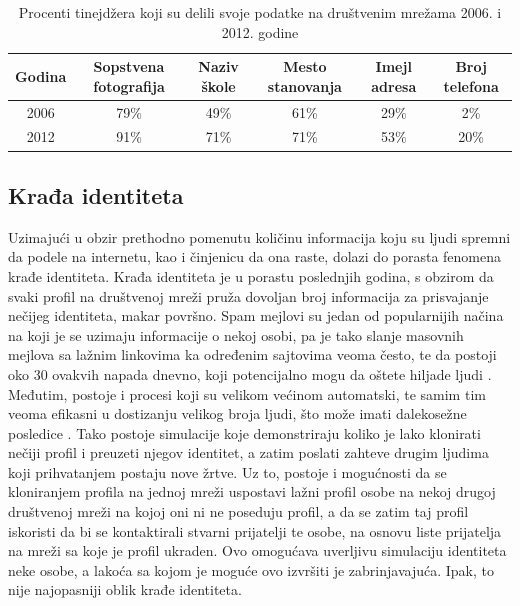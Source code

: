 \documentclass[a4paper]{article}
\begin{document}
\begin{table}[h!]
	\begin{center}
		\caption{Procenti tinejdžera koji su delili svoje podatke na društvenim mrežama 2006. i 2012. godine}
		\begin{tabular}{|c | c c c c c|} \hline
			Godina & Sopstvena fotografija & Naziv škole & Mesto stanovanja & Imejl adresa & Broj telefona \\
			\hline
			2006 & 79\% & 49\% & 61\% & 29\% & 2\% \\
			2012 & 91\% & 71\% & 71\% & 53\% & 20\%\\
			\hline
		\end{tabular}
		\label{tab:tabela1}
	\end{center}
\end{table}

\subsection{Krađa identiteta}
Uzimajući u obzir prethodno pomenutu količinu informacija koju su ljudi spremni da podele na internetu, kao i činjenicu da ona raste, dolazi do porasta fenomena krađe identiteta. Krađa identiteta je u porastu poslednjih godina, s obzirom da svaki profil na društvenoj mreži pruža dovoljan broj informacija za prisvajanje nečijeg identiteta, makar površno. Spam mejlovi su jedan od popularnijih načina na koji je se uzimaju informacije o nekoj osobi, pa je tako slanje masovnih mejlova sa lažnim linkovima ka određenim sajtovima veoma često, te da postoji oko 30 ovakvih napada dnevno, koji potencijalno mogu da oštete hiljade ljudi \cite{it1}. Međutim, postoje i procesi koji su velikom većinom automatski, te samim tim veoma efikasni u dostizanju velikog broja ljudi, što može imati dalekosežne posledice \cite{it2}. Tako postoje simulacije koje demonstriraju koliko je lako klonirati nečiji profil i preuzeti njegov identitet, a zatim poslati zahteve drugim ljudima koji prihvatanjem postaju nove žrtve. Uz to, postoje i mogućnosti da se kloniranjem profila na jednoj mreži uspostavi lažni profil osobe na nekoj drugoj društvenoj mreži na kojoj oni ni ne poseduju profil, a da se zatim taj profil iskoristi da bi se kontaktirali stvarni prijatelji te osobe, na osnovu liste prijatelja na mreži sa koje je profil ukraden. Ovo omogućava uverljivu simulaciju identiteta neke osobe, a lakoća sa kojom je moguće ovo izvršiti je zabrinjavajuća. Ipak, to nije najopasniji oblik krađe identiteta.
\end{document}
